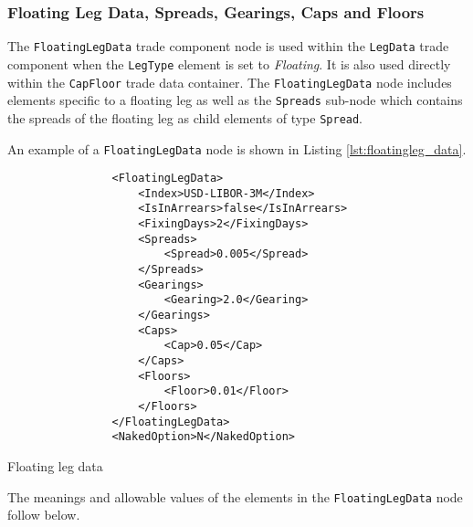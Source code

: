 \subsubsection{Floating Leg Data, Spreads, Gearings, Caps and Floors}
\label{ss:floatingleg_data}

The \lstinline!FloatingLegData! trade component node is used within the \lstinline!LegData! trade component when the
\lstinline!LegType! element is set to \emph{Floating}. It is also used directly within the \lstinline!CapFloor! trade
data container.  The \lstinline!FloatingLegData! node includes elements specific to a floating leg as well as the
\lstinline!Spreads! sub-node which contains the spreads of the floating leg as child elements of type
\lstinline!Spread!.

An example of a \lstinline!FloatingLegData! node is shown in Listing \ref{lst:floatingleg_data}.
\begin{listing}[H]
\begin{verbatim}
                <FloatingLegData>
                    <Index>USD-LIBOR-3M</Index>
                    <IsInArrears>false</IsInArrears>
                    <FixingDays>2</FixingDays>
                    <Spreads>
                        <Spread>0.005</Spread>
                    </Spreads>
                    <Gearings>
                        <Gearing>2.0</Gearing>
                    </Gearings>
                    <Caps>
                        <Cap>0.05</Cap>
                    </Caps>
                    <Floors>
                        <Floor>0.01</Floor>
                    </Floors>
                </FloatingLegData>
                <NakedOption>N</NakedOption>
\end{verbatim}
\caption{Floating leg data}
\label{lst:floatingleg_data}
\end{listing}

The meanings and allowable values of the elements in the \lstinline!FloatingLegData! node follow below.

